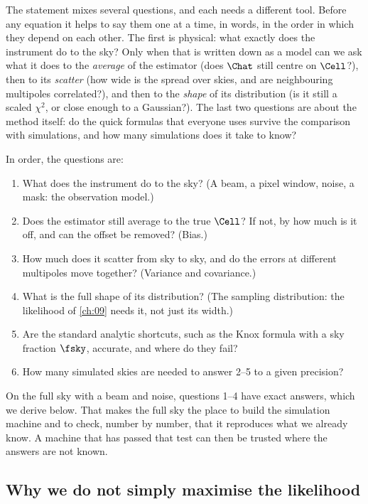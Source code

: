 The statement mixes several questions, and each needs a different tool. Before any
equation it helps to say them one at a time, in words, in the order in which they depend on
each other. The first is physical: what exactly does the instrument do to the sky? Only
when that is written down as a model can we ask what it does to the \emph{average} of the
estimator (does $\Chat$ still centre on $\Cell$?), then to its \emph{scatter} (how wide is the
spread over skies, and are neighbouring multipoles correlated?), and then to the
\emph{shape} of its distribution (is it still a scaled $\chi^2$, or close enough to a
Gaussian?). The last two questions are about the method itself: do the quick formulas that
everyone uses survive the comparison with simulations, and how many simulations does it take
to know?

In order, the questions are:
\begin{enumerate}
  \item What does the instrument do to the sky? (A beam, a pixel window, noise, a mask: the
        observation model.)
  \item Does the estimator still average to the true $\Cell$? If not, by how much is it
        off, and can the offset be removed? (Bias.)
  \item How much does it scatter from sky to sky, and do the errors at different
        multipoles move together? (Variance and covariance.)
  \item What is the full shape of its distribution? (The sampling distribution: the
        likelihood of \cref{ch:09} needs it, not just its width.)
  \item Are the standard analytic shortcuts, such as the Knox formula with a sky fraction
        $\fsky$, accurate, and where do they fail?
  \item How many simulated skies are needed to answer 2--5 to a given precision?
\end{enumerate}

On the full sky with a beam and noise, questions 1--4 have exact answers, which we derive below. That makes the full sky the place to build the simulation machine and to
check, number by number, that it reproduces what we already know. A machine that has passed
that test can then be trusted where the answers are not known.

\subsection{Why we do not simply maximise the likelihood}
\label{8a:sec:why-not-ml}


